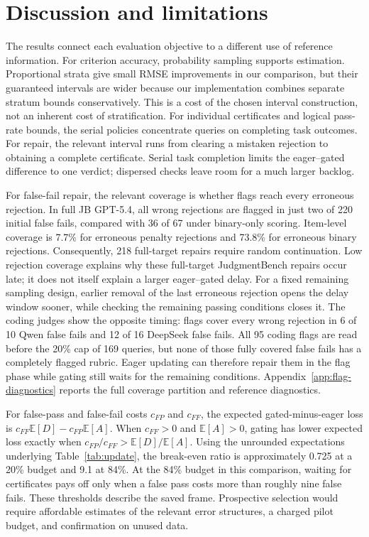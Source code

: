 \documentclass[10pt,letterpaper]{article}
\newcommand{\E}{\mathbb{E}}
\begin{document}
\section{Discussion and limitations}\label{sec:limits}
The results connect each evaluation objective to a different use of reference information. For criterion accuracy, probability sampling supports estimation. Proportional strata give small RMSE improvements in our comparison, but their guaranteed intervals are wider because our implementation combines separate stratum bounds conservatively. This is a cost of the chosen interval construction, not an inherent cost of stratification. For individual certificates and logical pass-rate bounds, the serial policies concentrate queries on completing task outcomes. For repair, the relevant interval runs from clearing a mistaken rejection to obtaining a complete certificate. Serial task completion limits the eager--gated difference to one verdict; dispersed checks leave room for a much larger backlog.

For false-fail repair, the relevant coverage is whether flags reach every erroneous rejection. In full JB GPT-5.4, all wrong rejections are flagged in just two of 220 initial false fails, compared with 36 of 67 under binary-only scoring. Item-level coverage is 7.7\% for erroneous penalty rejections and 73.8\% for erroneous binary rejections. Consequently, 218 full-target repairs require random continuation. Low rejection coverage explains why these full-target JudgmentBench repairs occur late; it does not itself explain a larger eager--gated delay. For a fixed remaining sampling design, earlier removal of the last erroneous rejection opens the delay window sooner, while checking the remaining passing conditions closes it. The coding judges show the opposite timing: flags cover every wrong rejection in 6 of 10 Qwen false fails and 12 of 16 DeepSeek false fails. All 95 coding flags are read before the 20\% cap of 169 queries, but none of those fully covered false fails has a completely flagged rubric. Eager updating can therefore repair them in the flag phase while gating still waits for the remaining conditions. Appendix~\ref{app:flag-diagnostics} reports the full coverage partition and reference diagnostics.

For false-pass and false-fail costs $c_{FP}$ and $c_{FF}$, the expected gated-minus-eager loss is $c_{FF}\E[D]-c_{FP}\E[A]$. When $c_{FF}>0$ and $\E[A]>0$, gating has lower expected loss exactly when $c_{FP}/c_{FF}>\E[D]/\E[A]$. Using the unrounded expectations underlying Table~\ref{tab:update}, the break-even ratio is approximately 0.725 at a 20\% budget and 9.1 at 84\%. At the 84\% budget in this comparison, waiting for certificates pays off only when a false pass costs more than roughly nine false fails. These thresholds describe the saved frame. Prospective selection would require affordable estimates of the relevant error structures, a charged pilot budget, and confirmation on unused data.
\end{document}
